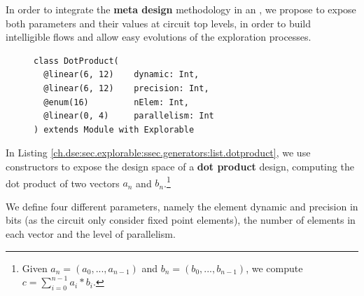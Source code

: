         In order to integrate the {\bf meta design} methodology in an , we propose to expose both parameters and their values at circuit top levels, in order to build intelligible flows and allow easy evolutions of the exploration processes.

        \begin{figure}[h!]
            \begin{lstlisting}[xleftmargin=0mm,
                               caption={Exposing the dot product design space},
                               label={ch.dse:sec.explorable:ssec.generators:list.dotproduct}]
class DotProduct(
  @linear(6, 12)    dynamic: Int,
  @linear(6, 12)    precision: Int,
  @enum(16)         nElem: Int,
  @linear(0, 4)     parallelism: Int
) extends Module with Explorable\end{lstlisting}
        \end{figure}

\clearpage
        In Listing \ref{ch.dse:sec.explorable:ssec.generators:list.dotproduct}, we use \chisel{} constructors to expose the design space of a {\bf dot product} design, computing the dot product of two vectors $a_n$ and $b_n$.\footnote{Given $a_n = (a_0, ..., a_{n-1})$ and $b_n = (b_0, ..., b_{n-1})$, we compute $c = \sum_{i = 0}^{n-1} a_i * b_i$.}
        
        We define four different parameters, namely the element dynamic and precision in bits (as the circuit only consider fixed point elements), the number of elements in each vector and the level of parallelism.

